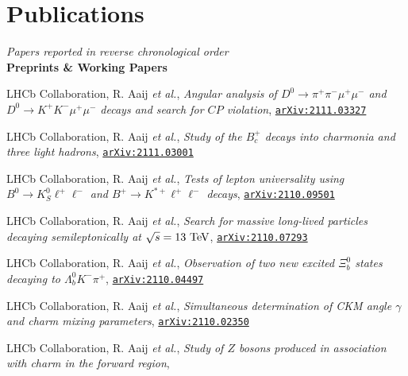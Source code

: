 \newcommand{\journal}[1]
  {\textbf{\large #1}\\\vspace{-5mm}}

\newcommand{\arxiv}[1]
  {\href{https://arxiv.org/abs/#1}{\texttt{arXiv:#1}}}


\section*{Publications}
\begin{cvcontent}
  \emph{Papers reported in reverse chronological order}\\[2.5mm]
  \journal{Preprints \& Working Papers}
  \begin{enumerate}[label={[\arabic*]}, leftmargin=1.5cm]
    \sloppy
    \item LHCb Collaboration, R. Aaij \emph{et al.}, 
    \emph{Angular analysis of $D^0 \to \pi^+\pi^-\mu^+\mu^-$ and $D^0 \to K^+K^-\mu^+\mu^-$ decays and search for $CP$ violation},
    \arxiv{2111.03327}
    \item LHCb Collaboration, R. Aaij \emph{et al.}, 
    \emph{Study of the $B_c^+$ decays into charmonia and three light hadrons},
    \arxiv{2111.03001}
    \item LHCb Collaboration, R. Aaij \emph{et al.}, 
    \emph{Tests of lepton universality using $B^0\to K^0_S \ell^+ \ell^-$ and $B^+\to K^{*+}\ell^+\ell^-$ decays},
    \arxiv{2110.09501}
    \item LHCb Collaboration, R. Aaij \emph{et al.}, 
    \emph{Search for massive long-lived particles decaying semileptonically at $\sqrt{s} = 13~\rm{TeV}$},
    \arxiv{2110.07293}
    \item LHCb Collaboration, R. Aaij \emph{et al.}, 
    \emph{Observation of two new excited $\Xi_b^0$ states decaying to  $\Lambda_b^0 K^- \pi^+$}, 
    \arxiv{2110.04497}
    \item LHCb Collaboration, R. Aaij \emph{et al.}, 
    \emph{Simultaneous determination of CKM angle $\gamma$ and charm mixing parameters}, 
    \arxiv{2110.02350}
    \item LHCb Collaboration, R. Aaij \emph{et al.}, 
    \emph{Study of $Z$ bosons produced in association with charm in the forward region}, 

\end{enumerate}
\end{cvcontent}
